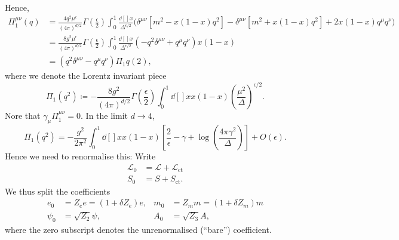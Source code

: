 Hence, 
\begin{align}
  \Pi_1^{\mu\nu} (q) &= \frac{4 q^2 \mu^{\epsilon}}{(4 \pi)^{d / 2}}
  \Gamma \left(\frac{\epsilon}{2}\right) \int_{0}^{1} \frac{\dd[]{x}}{\Delta^{\epsilon / 2}} \biggl(
    \delta^{\mu\nu} [m^2 - x(1 - x) q^2] - \delta^{\mu\nu} [m^2 + x (1 - x)q^2] + 2 x (1 - x) q^{\mu} q^{\nu} \biggr) \\
		     &= \frac{8 g^2 \mu^{\epsilon}}{(4 \pi)^{d / 2}} \Gamma \left( \frac{\epsilon}{2} \right) \int_{0}^{1} \frac{\dd[]{x}}{\Delta^{\epsilon / 2}} \left( -q^2 \delta^{\mu\nu} + q^{\mu} q^{\nu} \right) x (1 - x) \\
		     &= (q^2 \delta^{\mu\nu} - q^{\mu} q^{\nu}) \Pi_1 q(2),
\end{align}
where we denote the Lorentz invariant piece
\begin{equation}
  \Pi_1(q^2) \coloneqq - \frac{8 g^2}{(4 \pi)^{d / 2}} \Gamma \left( \frac{\epsilon}{2} \right) \int_{0}^{1}\dd[]{x} x(1-x) \left( \frac{\mu^2}{\Delta} \right)^{\epsilon / 2}.
\end{equation}
Nore that $\gamma_{\mu} \Pi_1^{\mu\nu} = 0$.
In the limit $d \to 4$,
\begin{equation}
  \Pi_1(q^2) = -\frac{g^2}{2 \pi^2} \int_{0}^{1}\dd[]{x}  x(1-x) \left[ \frac{2}{\epsilon} - \gamma + \log(\frac{4\pi \gamma^2}{\Delta}) \right] + O(\epsilon).
\end{equation}
Hence we need to renormalise this: Write
\begin{align}
  \mathscr{L}_0 &= \mathscr{L} + \mathscr{L}_{\text{ct}} \\
  S_0 &= S + S_{\text{ct}}.
\end{align}
We thus split the coefficients
\begin{align}
  e_0 &= Z_e e = (1 + \delta Z_e) e, & m_0 &= Z_m m = (1 + \delta Z_m) m \\
  \psi_0 &= \sqrt{Z_2} \psi, & A_0 &= \sqrt{Z_3} A,
\end{align}
where the zero subscript denotes the unrenormalised (``bare'') coefficient.

